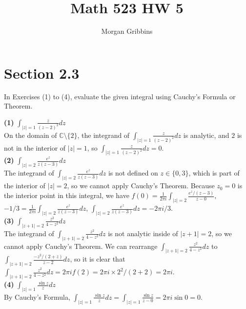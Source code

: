 \documentclass[12pt,letterpaper]{article}
\title{Math 523 HW 5}
\author{Morgan Gribbins}
\date{}
\begin{document}
	
\maketitle

\section*{Section 2.3} 

In Exercises (1) to (4), evaluate the given integral using Cauchy's Formula or Theorem.

\textbf{(1)} \(\int_{|z| = 1} \frac{z}{(z-2)^{2}} dz\) \\

On the domain of \(\mathbb{C}\setminus\{2\}\), the integrand of \(\int_{|z| = 1} \frac{z}{(z-2)^{2}} dz\) is analytic, and \(2\) is not in the interior of \(|z| = 1\), so \(\int_{|z| = 1} \frac{z}{(z-2)^{2}} dz = 0.\) \\

\textbf{(2)}  \(\int_{|z| = 2} \frac{e^{z}}{z(z-3)} dz\) \\

The integrand of \(\int_{|z| = 2} \frac{e^{z}}{z(z-3)} dz\) is not defined on \(z \in \{0,3\}\), which is part of the interior of \(|z| = 2\), so we cannot apply Cauchy's Theorem. Because \(z_{0} = 0\) is the interior point in this integral, we have \(f(0) = \frac{1}{2\pi i} \int_{|z|=2} \frac{e^{z}/(z-3)}{z-0}\), \(-1/3 = \frac{1}{2\pi i} \int_{|z| = 2} \frac{e^{z}}{z(z-3)} dz\), \(\int_{|z| = 2} \frac{e^{z}}{z(z-3)} dz = -2\pi i /3\). \\

\textbf{(3)} \(\int_{|z+1| = 2} \frac{z^{2}}{4-z^{2}} dz\) \\

The integrand of \(\int_{|z+1| = 2} \frac{z^{2}}{4-z^{2}} dz\) is not analytic inside of \(|z+1| = 2\), so we cannot apply Cauchy's Theorem. We can rearrange \(\int_{|z+1| = 2} \frac{z^{2}}{4-z^{2}} dz\) to \(\int_{|z+1| = 2} \frac{-z^{2}/(2+z)}{z-2} dz\), so it is clear that \(\int_{|z+1| = 2} \frac{z^{2}}{4-z^{2}} dz = 2\pi i f(2) = 2\pi i \times 2^{2}/(2+2) = 2\pi i\). \\

\textbf{(4)} \(\int_{|z| = 1} \frac{\sin z}{z} dz\) \\

By Cauchy's Formula, \(\int_{|z| = 1} \frac{\sin z}{z} dz = \int_{|z| = 1} \frac{\sin z}{z-0} = 2\pi i \sin 0 = 0\). \\
\end{document}
